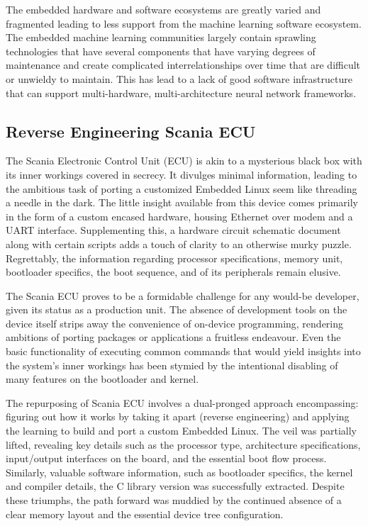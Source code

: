 The embedded hardware and software ecosystems are greatly varied and fragmented leading to less support from the machine learning software ecosystem. The embedded machine learning communities largely contain sprawling technologies that have several components that have varying degrees of maintenance and create complicated interrelationships over time that are difficult or unwieldy to maintain. This has lead to a lack of good software infrastructure that can support multi-hardware, multi-architecture neural network frameworks.

\subsection{Reverse Engineering Scania ECU}

The Scania Electronic Control Unit (ECU) is akin to a mysterious black box with its inner workings covered in secrecy. It divulges minimal information, leading to the ambitious task of porting a customized Embedded Linux seem like threading a needle in the dark. The little insight available from this device comes primarily in the form of a custom encased hardware, housing Ethernet over modem and a UART interface. Supplementing this, a hardware circuit schematic document along with certain scripts adds a touch of clarity to an otherwise murky puzzle. Regrettably, the information regarding processor specifications, memory unit, bootloader specifics, the boot sequence, and of its peripherals remain elusive.

The Scania ECU proves to be a formidable challenge for any would-be developer,  given its status as a production unit. The absence of development tools on the device itself strips away the convenience of on-device programming, rendering ambitions of porting packages or applications a fruitless endeavour. Even the basic functionality of executing common commands that would yield insights into the system's inner workings has been stymied by the intentional disabling of many features on the bootloader and kernel.

The repurposing of Scania ECU involves a dual-pronged approach encompassing: figuring out how it works by taking it apart (reverse engineering) and applying the learning to build and port a custom Embedded Linux. The veil was partially lifted, revealing key details such as the processor type, architecture specifications, input/output interfaces on the board, and the essential boot flow process. Similarly, valuable software information, such as bootloader specifics, the kernel and compiler details, the C library version was successfully extracted. Despite these triumphs, the path forward was muddied by the continued absence  of a clear memory layout  and the essential device tree configuration.

